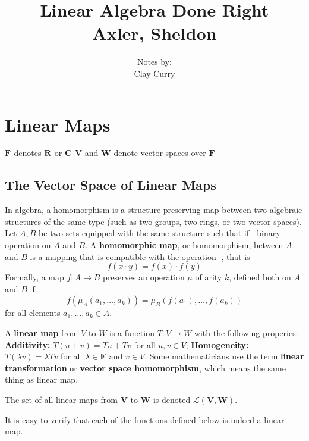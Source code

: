 \documentclass[11pt]{article} %
\title{Linear Algebra Done Right \\ Axler, Sheldon}
\author{Notes by:  \\ Clay Curry}
\date{}
\newcommand\R[1]{\text{$\mathbf{R^{#1}}$}}
\newcommand\C[1]{\text{$\mathbf{C^{#1}}$}}
\newcommand\F[1]{\text{$\mathbf{F^{#1}}$}}
\newcommand\V{\text{$\mathbf{V}$}}
\newcommand\W{\text{$\mathbf{W}$}}
\newcommand\0{\text{$\mathbf{0}$}}
\renewcommand\L[2]{\mathcal{L}(#1,#2)}
\begin{document}
\section{Linear Maps}
{\points
{$\F{}$ denotes $\R{}$ or $\C{}$}
{$\V$ and $\W$ denote vector spaces over $\F{}$}
}

\subsection{The Vector Space of Linear Maps}
In algebra, a homomorphism is a structure-preserving map between two algebraic structures of the same type (such as two groups, two rings, or two vector spaces).
{
Let $A, B$ be two sets equipped with the same structure such that if $\cdot$ binary operation on $A$ and $B$. A \textbf{homomorphic map}, or homomorphism, between $A$ and $B$ is a mapping that is compatible with the operation $\cdot$, that is
$$
f(x \cdot y) = f(x) \cdot f(y)
$$
Formally, a map $f : A \to B$ preserves an operation $\mu$ of arity $k$, defined both on $A$ and $B$ if
$$
f(\mu_A(a_1, \ldots, a_k)) = \mu_B(f(a_1), \ldots, f(a_k))
$$
for all elements $a_1, \ldots, a_k \in A$.
}

{
A \textbf{linear map} from $V$ to $W$ is a function $T : V \to W$ with the following properies:
\points
{\textbf{Additivity: } $T(u+v) = Tu + Tv$ for all $u, v \in V$;}
{\textbf{Homogeneity: } $T(\lambda v) = \lambda Tv$ for all $\lambda \in \F{}$ and $v \in V$.}
}
Some mathematicians use the term \textbf{linear transformation} or \textbf{vector space homomorphism}, which means the same thing as linear map. 

\definition{$\L{V}{W}$}
{The set of all linear maps from $\V$ to $\W$ is denoted $\L{\V}{\W}$.}

It is easy to verify that each of the functions defined below is indeed a linear map.
\end{document}
